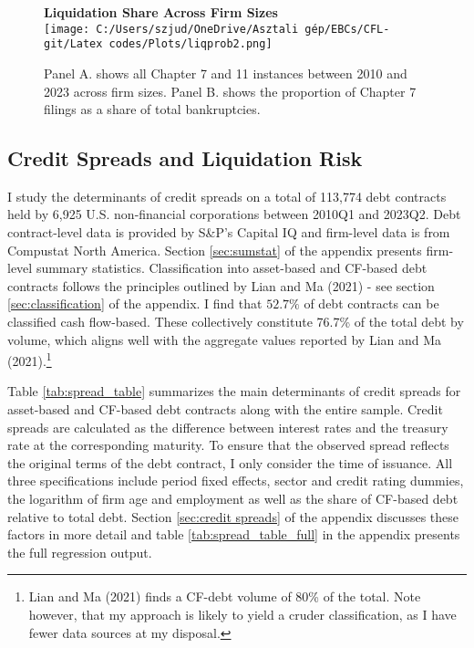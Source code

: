 \documentclass[12pt]{article}
\begin{document}
\begin{figure}[H]  %
    \centering  
    \textbf{\large Liquidation Share Across Firm Sizes \vspace{2mm} } \\  %
    \texttt{[image: C:/Users/szjud/OneDrive/Asztali gép/EBCs/CFL-git/Latex codes/Plots/liqprob2.png]}
    \caption{ \small Panel A. shows all Chapter 7 and 11 instances between 2010 and 2023 across firm sizes. Panel B. shows the proportion of Chapter 7 filings as a share of total bankruptcies.}
    \label{chart:liqprob_emp}
\end{figure}

\subsection{Credit Spreads and Liquidation Risk \label{sec:emp liqrisk}} 

I study the determinants of credit spreads on a total of 113,774 debt contracts held by 6,925 U.S. non-financial corporations between 2010Q1 and 2023Q2. Debt contract-level data is provided by S\&P's Capital IQ and firm-level data is from Compustat North America. Section \ref{sec:sumstat} of the appendix presents firm-level summary statistics. Classification into asset-based and CF-based debt contracts follows the principles outlined by Lian and Ma (2021) - see section \ref{sec:classification} of the appendix. I find that $52.7\%$ of debt contracts can be classified cash flow-based. These collectively constitute 76.7\% of the total debt by volume, which aligns well with the aggregate values reported by Lian and Ma (2021).\footnote{Lian and Ma (2021) finds a CF-debt volume of 80\% of the total. Note however, that my approach is likely to yield a cruder classification, as I have fewer data sources at my disposal.}  
 
Table \ref{tab:spread_table} summarizes the main determinants of credit spreads for asset-based and CF-based debt contracts along with the entire sample. Credit spreads are calculated as the difference between interest rates and the treasury rate at the corresponding maturity. To ensure that the observed spread reflects the original terms of the debt contract, I only consider the time of issuance. All three specifications include period fixed effects, sector and credit rating dummies, the logarithm of firm age and employment as well as the share of CF-based debt relative to total debt. Section \ref{sec:credit spreads} of the appendix discusses these factors in more detail and table \ref{tab:spread_table_full} in the appendix presents the full regression output. 
\end{document}
